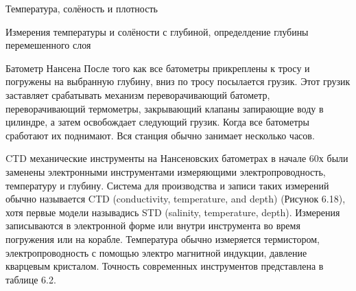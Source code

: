 \begin{chapter}{Температура, солёность и плотность}
\begin{section}{Измерения температуры и солёности с глубиной, определдение глубины перемешенного слоя}
\begin{paragraph}{Батометр Нансена}
После того как все батометры прикреплены к тросу и погружены на
выбранную глубину, вниз по тросу посылается грузик. Этот грузик
заставляет срабатывать механизм переворачивающий батометр,
переворачивающий термометры, закрывающий клапаны запирающие воду в
цилиндре, а затем освобождает следующий грузик. Когда все батометры
сработают их поднимают. Вся станция обычно занимает несколько часов.
%
\end{paragraph}

\begin{paragraph}{CTD}
механические инструменты на Нансеновских батометрах в начале 60х были
заменены электронными инструментами измеряющими электропроводность,
температуру и глубину. Система для производства и записи таких
измерений обычно называется CTD (conductivity, temperature, and depth)
(Рисунок 6.18), хотя первые модели называдись STD (salinity,
temperature, depth). Измерения записываются в электронной форме или
внутри инструмента во время погружения или на корабле. Температура
обычно измеряется термистором, электропроводность с помощью электро
магнитной индукции, давление кварцевым кристалом. Точность современных
инструментов представлена в таблице 6.2.
%


\end{paragraph}
\end{section}
\end{chapter}
